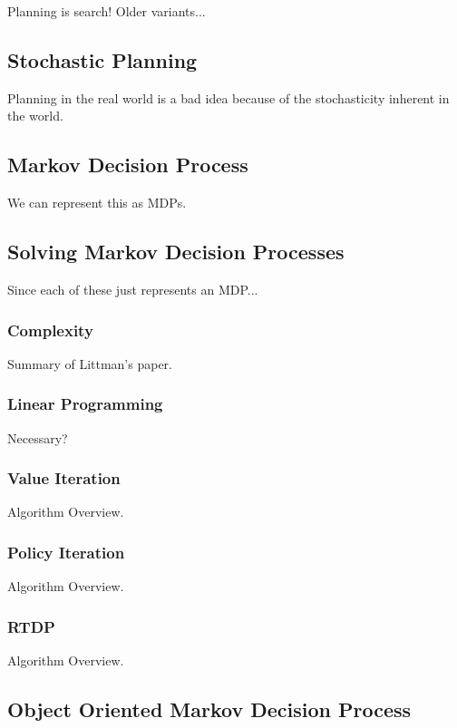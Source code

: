 \documentclass[11pt]{article}
\begin{document}
Planning is search! Older variants...

\subsection{Stochastic Planning}

Planning in the real world is a bad idea because of the stochasticity inherent in the world.

\subsection{Markov Decision Process}

We can represent this as MDPs.

\subsection{Solving Markov Decision Processes}

Since each of these just represents an MDP...

\subsubsection{Complexity}
Summary of Littman's paper.
\subsubsection{Linear Programming}
Necessary?
\subsubsection{Value Iteration}

Algorithm Overview.

\subsubsection{Policy Iteration}

Algorithm Overview.

\subsubsection{RTDP}

Algorithm Overview.

\subsection{Object Oriented Markov Decision Process}
\end{document}
